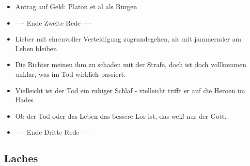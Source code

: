 \documentclass[emulatestandardclasses]{scrartcl}
\begin{document}
\begin{itemize}
  \item Antrag auf Geld: Platon et al als Bürgen
  \item ---- Ende Zweite Rede ----
  \item Lieber mit ehrenvoller Verteidigung zugrundegehen, als mit jammernder am Leben bleiben.
  \item Die Richter meinen ihm zu schaden mit der Strafe, doch ist doch vollkommen unklar, was im Tod wirklich passiert. 
  \item Vielleicht ist der Tod ein ruhiger Schlaf - vielleicht trifft er auf die Heroen im Hades.
  \item Ob der Tod oder das Leben das bessere Los ist, das weiß nur der Gott.
  \item ---- Ende Dritte Rede ----
\end{itemize}

\subsection{Laches}
\end{document}
